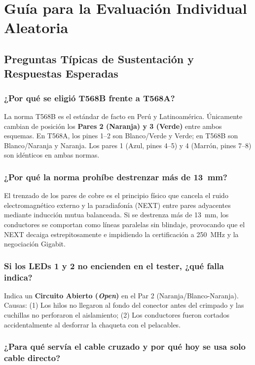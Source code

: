 \section{Guía para la Evaluación Individual Aleatoria}

\subsection{Preguntas Típicas de Sustentación y Respuestas Esperadas}

\subsubsection{¿Por qué se eligió T568B frente a T568A?}

La norma T568B es el estándar de facto en Perú y Latinoamérica. Únicamente cambian de posición los \textbf{Pares 2 (Naranja) y 3 (Verde)} entre ambos esquemas. En T568A, los pines 1--2 son Blanco/Verde y Verde; en T568B son Blanco/Naranja y Naranja. Los pares 1 (Azul, pines 4--5) y 4 (Marrón, pines 7--8) son idénticos en ambas normas.

\subsubsection{¿Por qué la norma prohíbe destrenzar más de 13~mm?}

El trenzado de los pares de cobre es el principio físico que cancela el ruido electromagnético externo y la paradiafonía (NEXT) entre pares adyacentes mediante inducción mutua balanceada. Si se destrenza más de 13~mm, los conductores se comportan como líneas paralelas sin blindaje, provocando que el NEXT decaiga estrepitosamente e impidiendo la certificación a 250~MHz y la negociación Gigabit.

\subsubsection{Si los LEDs 1 y 2 no encienden en el tester, ¿qué falla indica?}

Indica un \textbf{Circuito Abierto (\textit{Open})} en el Par 2 (Naranja/Blanco-Naranja). Causas: (1) Los hilos no llegaron al fondo del conector antes del crimpado y las cuchillas no perforaron el aislamiento; (2) Los conductores fueron cortados accidentalmente al desforrar la chaqueta con el pelacables.

\subsubsection{¿Para qué servía el cable cruzado y por qué hoy se usa solo cable directo?}

